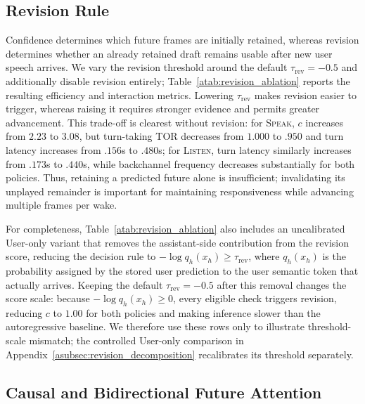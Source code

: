 


\subsection{Revision Rule}
\label{asubsec:revision}

Confidence determines which future frames are initially retained, whereas revision determines whether an already retained draft remains usable after new user speech arrives.
We vary the revision threshold around the default $\tau_{\mathrm{rev}}=-0.5$ and additionally disable revision entirely; Table~\ref{atab:revision_ablation} reports the resulting efficiency and interaction metrics.
Lowering $\tau_{\mathrm{rev}}$ makes revision easier to trigger, whereas raising it requires stronger evidence and permits greater advancement.
This trade-off is clearest without revision: for \textsc{Speak}, $c$ increases from $2.23$ to $3.08$, but turn-taking TOR decreases from $1.000$ to $.950$ and turn latency increases from $.156$s to $.480$s; for \textsc{Listen}, turn latency similarly increases from $.173$s to $.440$s, while backchannel frequency decreases substantially for both policies.
Thus, retaining a predicted future alone is insufficient; invalidating its unplayed remainder is important for maintaining responsiveness while advancing multiple frames per wake.

For completeness, Table~\ref{atab:revision_ablation} also includes an uncalibrated User-only variant that removes the assistant-side contribution from the revision score, reducing the decision rule to $-\log q_h(x_h)\geq\tau_{\mathrm{rev}}$, where $q_h(x_h)$ is the probability assigned by the stored user prediction to the user semantic token that actually arrives.
Keeping the default $\tau_{\mathrm{rev}}=-0.5$ after this removal changes the score scale: because $-\log q_h(x_h)\geq0$, every eligible check triggers revision, reducing $c$ to $1.00$ for both policies and making inference slower than the autoregressive baseline.
We therefore use these rows only to illustrate threshold-scale mismatch; the controlled User-only comparison in Appendix~\ref{asubsec:revision_decomposition} recalibrates its threshold separately.


\subsection{Causal and Bidirectional Future Attention}
\label{asubsec:future_attention}



